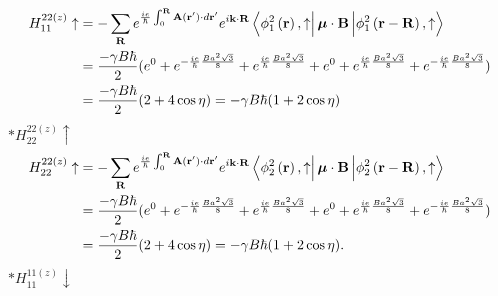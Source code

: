\documentclass{report}
\newcommand{\f}[2]{\dfrac{#1}{#2}}
\begin{document}
\begin{align*}
	H_{11}^{22(z)} \uparrow & = - \sum_{\mathbf{R}} e^{\frac{ie}{\hbar}\int_0^{\mathbf{R}}\mathbf{A}(\mathbf{r'})\cdot d\mathbf{r'}}e^{i\mathbf{k\cdot R}} \bra{\phi^{2}_{1} \left(\mathbf{r}\right), \uparrow} \boldsymbol{\mu}\cdot \mathbf{B} \ket{\phi^{2}_{1} \left(\mathbf{r - R}\right) ,\uparrow} \\
	                        & = \f{ -\gamma B\hbar}{2} (e^{0} + e^{-\frac{ie}{\hbar}\frac{Ba^2\sqrt{3}}{8}} + e^{\frac{ie}{\hbar}\frac{Ba^2\sqrt{3}}{8}} + e^{0} +
	e^{\frac{ie}{\hbar}\frac{Ba^2\sqrt{3}}{8}}
	+ e^{-\frac{ie}{\hbar}\frac{Ba^2\sqrt{3}}{8}} )                                                                                                                                                                                                                                                       \\
	                        & = \f{-\gamma B\hbar}{2} (2 + 4\cos\eta)  = -\gamma B\hbar(1+2\cos\eta)
\end{align*}
$\ast 	H_{22}^{22(z)} \uparrow$
\begin{align*}
	H_{22}^{22(z)} \uparrow & = - \sum_{\mathbf{R}} e^{\frac{ie}{\hbar}\int_0^{\mathbf{R}}\mathbf{A}(\mathbf{r'})\cdot d\mathbf{r'}}e^{i\mathbf{k\cdot R}} \bra{\phi^{2}_{2} \left(\mathbf{r}\right), \uparrow} \boldsymbol{\mu}\cdot \mathbf{B} \ket{\phi^{2}_{2} \left(\mathbf{r - R}\right) ,\uparrow} \\
	                        & = \f{ -\gamma B\hbar}{2} (e^{0} + e^{-\frac{ie}{\hbar}\frac{Ba^2\sqrt{3}}{8}} + e^{\frac{ie}{\hbar}\frac{Ba^2\sqrt{3}}{8}} + e^{0} +
	e^{\frac{ie}{\hbar}\frac{Ba^2\sqrt{3}}{8}}
	+ e^{-\frac{ie}{\hbar}\frac{Ba^2\sqrt{3}}{8}} )                                                                                                                                                                                                                                                       \\
	                        & = \f{-\gamma B\hbar}{2} (2 + 4\cos\eta)  = -\gamma B\hbar(1+2\cos\eta).
\end{align*}
$\ast 	H_{11}^{11(z)} \downarrow$
\end{document}

